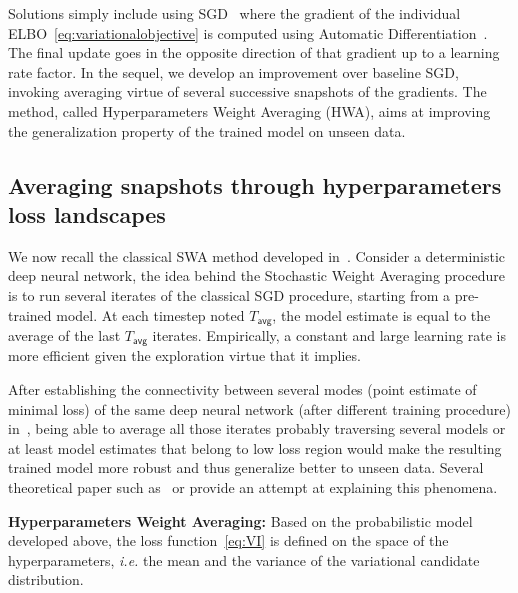 \documentclass{article} %
\begin{document}
Solutions simply include using SGD~\citep{bottou2008tradeoffs} where the gradient of the individual ELBO~\eqref{eq:variationalobjective} is computed using Automatic Differentiation~\citep{kucukelbir2017automatic}. The final update goes in the opposite direction of that gradient up to a learning rate factor.
In the sequel, we develop an improvement over baseline SGD, invoking averaging virtue of several successive snapshots of the gradients.
The method, called Hyperparameters Weight Averaging (HWA), aims at improving the generalization property of the trained model on unseen data.


\subsection{Averaging snapshots through hyperparameters loss landscapes}

We now recall the classical SWA method developed in~\citep{izmailov2018averaging}. 
Consider a deterministic deep neural network, the idea behind the Stochastic Weight Averaging procedure is to run several iterates of the classical SGD procedure, starting from a pre-trained model.
At each timestep noted $T_{\mathsf{avg}}$, the model estimate is equal to the average of the last $T_{\mathsf{avg}}$ iterates.
Empirically, a constant and large learning rate is more efficient given the exploration virtue that it implies.

After establishing the connectivity between several modes (point estimate of minimal loss) of the same deep neural network (after different training procedure) in~\citep{garipov2018loss}, being able to average all those iterates probably traversing several models or at least model estimates that belong to low loss region would make the resulting trained model more robust and thus generalize better to unseen data.
Several theoretical paper such as~\citep{he2019asymmetric} or \citep{keskar2016large} provide an attempt at explaining this phenomena.


\textbf{Hyperparameters Weight Averaging:}
Based on the probabilistic model developed above, the loss function~\eqref{eq:VI} is defined on the space of the hyperparameters, \textit{i.e.} the mean and the variance of the variational candidate distribution.
\end{document}
